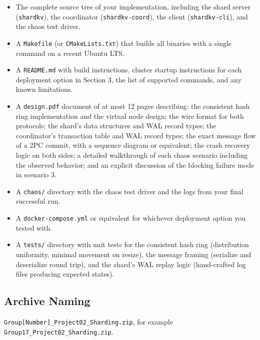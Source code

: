 \documentclass[11pt,a4paper]{article}
\begin{document}
\begin{itemize}
\item The complete source tree of your implementation, including the shard server (\texttt{shardkv}), the coordinator (\texttt{shardkv-coord}), the client (\texttt{shardkv-cli}), and the chaos test driver.

\item A \texttt{Makefile} (or \texttt{CMakeLists.txt}) that builds all binaries with a single command on a recent Ubuntu LTS.

\item A \texttt{README.md} with build instructions, cluster startup instructions for each deployment option in Section 3, the list of supported commands, and any known limitations.

\item A \texttt{design.pdf} document of at most 12 pages describing: the consistent hash ring implementation and the virtual node design; the wire format for both protocols; the shard's data structures and WAL record types; the coordinator's transaction table and WAL record types; the exact message flow of a 2PC commit, with a sequence diagram or equivalent; the crash recovery logic on both sides; a detailed walkthrough of each chaos scenario including the observed behavior; and an explicit discussion of the blocking failure mode in scenario 3.

\item A \texttt{chaos/} directory with the chaos test driver and the logs from your final successful run.

\item A \texttt{docker-compose.yml} or equivalent for whichever deployment option you tested with.

\item A \texttt{tests/} directory with unit tests for the consistent hash ring (distribution uniformity, minimal movement on resize), the message framing (serialize and deserialize round trip), and the shard's WAL replay logic (hand-crafted log files producing expected states).
\end{itemize}

\subsection{Archive Naming}
\texttt{Group[Number]\_Project02\_Sharding.zip}, for example \texttt{Group17\_Project02\_Sharding.zip}.
\end{document}
